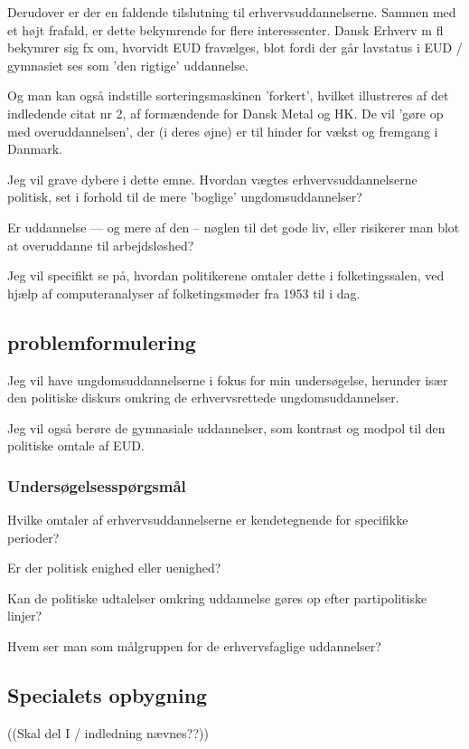 Derudover er der en faldende tilslutning til erhvervsuddannelserne. Sammen med et højt frafald, er dette bekymrende for flere interessenter.
Dansk Erhverv m fl bekymrer sig fx om, hvorvidt EUD fravælges, blot fordi der går lavstatus i EUD / gymnasiet ses som 'den rigtige' uddannelse.

Og man kan også indstille sorteringsmaskinen 'forkert', hvilket illustreres af det indledende citat nr 2, af formændende for Dansk Metal og HK.
De vil 'gøre op med overuddannelsen', der (i deres øjne) er til hinder for vækst og fremgang i Danmark. 

Jeg vil grave dybere i dette emne.
Hvordan vægtes erhvervsuddannelserne politisk, set i forhold til de mere 'boglige' ungdomsuddannelser?

Er uddannelse --- og mere af den -- nøglen til det gode liv, eller risikerer man blot at overuddanne til arbejdsløshed?


Jeg vil specifikt se på, hvordan politikerene omtaler dette i folketingssalen, ved hjælp af computeranalyser af folketingsmøder fra 1953 til i dag.


\subsection{problemformulering}

Jeg vil have ungdomsuddannelserne i fokus for min undersøgelse, herunder især den politiske diskurs omkring de erhvervsrettede ungdomsuddannelser.

Jeg vil også berøre de gymnasiale uddannelser, som kontrast og modpol til den politiske omtale af EUD.


\subsubsection{Undersøgelsesspørgsmål}

Hvilke omtaler af erhvervsuddannelserne er kendetegnende for specifikke perioder?

Er der politisk enighed eller uenighed?

Kan de politiske udtalelser omkring uddannelse gøres op efter partipolitiske linjer?

Hvem ser man som målgruppen for de erhvervsfaglige uddannelser?

\subsection{Specialets opbygning}
((Skal del I / indledning nævnes??))

